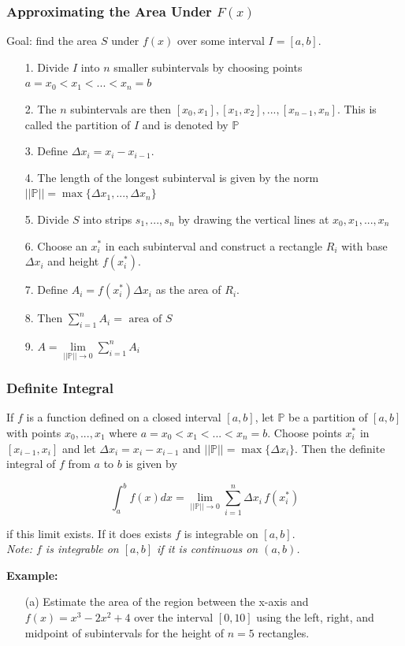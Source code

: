 \documentclass{beamer}
\begin{document}
\begin{frame}
\frametitle{\textbf{Approximating the Area Under $F(x)$}}
Goal: find the area $S$ under $f(x)$ over some interval $I=[a,b]$.
\begin{itemize}
	\item[1.] Divide $I$ into $n$ smaller subintervals by choosing points $a=x_0<x_1<...<x_n=b$
	\item[2.] The $n$ subintervals are then $[x_0,x_1],[x_1,x_2],...,[x_{n-1},x_n]$. This is called the partition of $I$ and is denoted by $\mathbb{P}$
	\item[3.] Define $\Delta x_i = x_i-x_{i-1}$.
	\item[4.] The length of the longest subinterval is given by the norm $||\mathbb{P}|| = \max\{\Delta x_1,...,\Delta x_n\}$
	\item[5.] Divide $S$ into strips $s_1,...,s_n$ by drawing the vertical lines at $x_0,x_1,...,x_n$
	\item[6.] Choose an $x_i^*$ in each subinterval and construct a rectangle $R_i$ with base $\Delta x_i$ and height $f(x_i^*)$.
	\item[7.] Define $A_i = f(x_i^*) \Delta x_i$ as the area of $R_i$.
	\item[8.] Then $\sum_{i=1}^{n} A_i = \mbox{ area of } S$
	\item[9.] $A = \lim\limits_{||\mathbb{P}|| \to 0} \sum_{i=1}^{n} A_i$
\end{itemize}


\end{frame}

\begin{frame}
\frametitle{\textbf{Definite Integral}}
If $f$ is a function defined on a closed interval $[a,b]$, let $\mathbb{P}$ be a partition of $[a,b]$ with points $x_0,...,x_1$ where $a=x_0<x_1<...<x_n=b$. Choose points $x_i^*$ in $[x_{i-1},x_i]$ and let $\Delta x_i = x_i - x_{i-1}$ and $||\mathbb{P}|| = \max\{ \Delta x_i \}$. Then the definite integral of $f$ from $a$ to $b$ is given by

$$\int_{a}^{b} f(x)dx =  \lim\limits_{||\mathbb{P}|| \to 0} \sum_{i=1}^{n} \Delta x_i \, f(x_i^*)$$

if this limit exists. If it does exists $f$ is integrable on $[a,b]$.\\

\vspace{6pt}
\textit{Note: $f$ is integrable on $[a,b]$ if it is continuous on $(a,b)$.}

\vspace{6pt}
\textbf{Example:}
\begin{itemize}
	\item[(a)] Estimate the area of the region between the x-axis and $f(x) = x^3-2x^2+4$ over the interval $[0,10]$ using the left, right, and midpoint of subintervals for the height of $n=5$ rectangles.
\end{itemize}

\end{frame}
\end{document}
